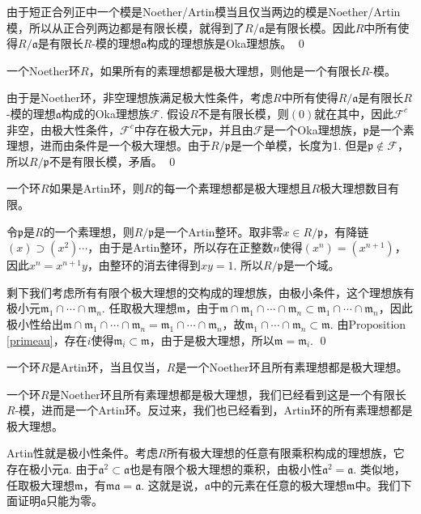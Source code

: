 	由于短正合列正中一个模是Noether/Artin模当且仅当两边的模是Noether/Artin模，所以从正合列两边都是有限长模，就得到了$R/\mathfrak{a}$是有限长模。因此$R$中所有使得$R/\mathfrak{a}$是有限长$R$-模的理想$\mathfrak{a}$构成的理想族是Oka理想族。
\qed

\pro 一个Noether环$R$，如果所有的素理想都是极大理想，则他是一个有限长$R$-模。

\proof
	由于是Noether环，非空理想族满足极大性条件，考虑$R$中所有使得$R/\mathfrak{a}$是有限长$R$-模的理想$\mathfrak{a}$构成的Oka理想族$\mathcal{F}$. 假设$R$不是有限长模，则$(0)$就在其中，因此$\mathcal{F}^c$非空，由极大性条件，$\mathcal{F}^c$中存在极大元$\mathfrak{p}$，并且由$\mathcal{F}$是一个Oka理想族，$\mathfrak{p}$是一个素理想，进而由条件是一个极大理想。由于$R/\mathfrak{p}$是一个单模，长度为1. 但是$\mathfrak{p}\not\in \mathcal{F}$，所以$R/\mathfrak{p}$不是有限长模，矛盾。
\qed

\pro 一个环$R$如果是Artin环，则$R$的每一个素理想都是极大理想且$R$极大理想数目有限。

\proof
	令$\mathfrak{p}$是$R$的一个素理想，则$R/\mathfrak{p}$是一个Artin整环。取非零$x\in R/\mathfrak{p}$，有降链$(x)\supset (x^2)\cdots$，由于是Artin整环，所以存在正整数$n$使得$(x^n)=(x^{n+1})$，因此$x^n=x^{n+1}y$，由整环的消去律得到$xy=1$. 所以$R/\mathfrak{p}$是一个域。

	剩下我们考虑所有有限个极大理想的交构成的理想族，由极小条件，这个理想族有极小元$\mathfrak{m}_1\cap \cdots \cap \mathfrak{m}_n$. 任取极大理想$\mathfrak{m}$，由于$\mathfrak{m}\cap\mathfrak{m}_1\cap \cdots \cap \mathfrak{m}_n\subset \mathfrak{m}_1\cap \cdots \cap \mathfrak{m}_n$，因此极小性给出$\mathfrak{m}\cap\mathfrak{m}_1\cap \cdots \cap \mathfrak{m}_n=\mathfrak{m}_1\cap \cdots \cap \mathfrak{m}_n$，故$\mathfrak{m}_1\cap \cdots \cap \mathfrak{m}_n\subset \mathfrak{m}$. 由Proposition \eqref{primeau}，存在$i$使得$\mathfrak{m}_i\subset \mathfrak{m}$，由于是极大理想，所以$\mathfrak{m}=\mathfrak{m}_i$.
\qed

\pro 一个环$R$是Artin环，当且仅当，$R$是一个Noether环且所有素理想都是极大理想。

\proof
	一个环$R$是Noether环且所有素理想都是极大理想，我们已经看到这是一个有限长$R$-模，进而是一个Artin环。反过来，我们也已经看到，Artin环的所有素理想都是极大理想。

	Artin性就是极小性条件。考虑$R$所有极大理想的任意有限乘积构成的理想族，它存在极小元$\mathfrak{a}$. 由于$\mathfrak{a}^2\subset \mathfrak{a}$也是有限个极大理想的乘积，由极小性$\mathfrak{a}^2=\mathfrak{a}$. 类似地，任取极大理想$\mathfrak{m}$，有$\mathfrak{m}\mathfrak{a}=\mathfrak{a}$. 这就是说，$\mathfrak{a}$中的元素在任意的极大理想$\mathfrak{m}$中。我们下面证明$\mathfrak{a}$只能为零。

